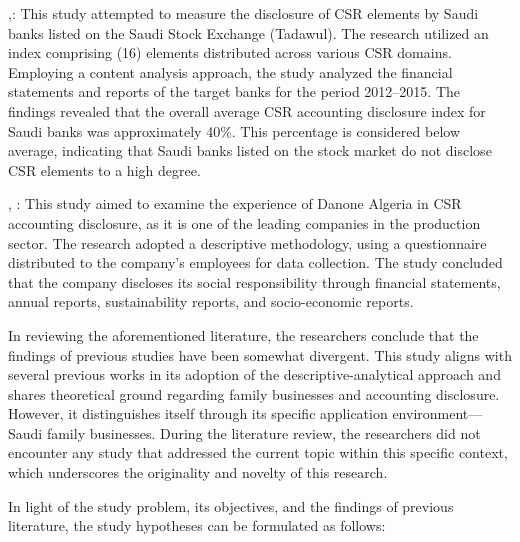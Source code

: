 \documentclass[10pt]{NSP1}
\begin{document}
\cite{ref5},: This study attempted to measure the disclosure of CSR elements by Saudi banks listed on the Saudi Stock Exchange (Tadawul). The research utilized an index comprising (16) elements distributed across various CSR domains. Employing a content analysis approach, the study analyzed the financial statements and reports of the target banks for the period 2012–2015. The findings revealed that the overall average CSR accounting disclosure index for Saudi banks was approximately 40\%. This percentage is considered below average, indicating that Saudi banks listed on the stock market do not disclose CSR elements to a high degree.

\cite{ref22}, : This study aimed to examine the experience of Danone Algeria in CSR accounting disclosure, as it is one of the leading companies in the production sector. The research adopted a descriptive methodology, using a questionnaire distributed to the company’s employees for data collection. The study concluded that the company discloses its social responsibility through financial statements, annual reports, sustainability reports, and socio-economic reports.

In reviewing the aforementioned literature, the researchers conclude that the findings of previous studies have been somewhat divergent. This study aligns with several previous works in its adoption of the descriptive-analytical approach and shares theoretical ground regarding family businesses and accounting disclosure. However, it distinguishes itself through its specific application environment—Saudi family businesses. During the literature review, the researchers did not encounter any study that addressed the current topic within this specific context, which underscores the originality and novelty of this research.

\par\vspace{6.0pt}\vspace{12.0pt}

In light of the study problem, its objectives, and the findings of previous literature, the study hypotheses can be formulated as follows:
\end{document}
